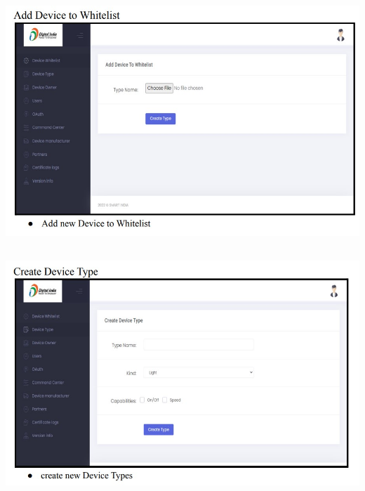 
\begin{center}
\includegraphics[height=9cm,width=14cm]{Admin/Addwhitelist.jpg}
\end{center}
\pagebreak


\begin{center}
\includegraphics[height=9cm,width=14cm]{Admin/Adddivice.jpg}
\end{center}




